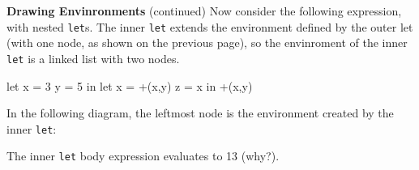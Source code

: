 \begin{minipage}[t]{\sw}
\slidenumber
\LARGE
{\bf Drawing Envinronments} (continued)\exx
Now consider the following expression,
with nested \verb'let's.
The inner \verb'let' extends the environment defined
by the outer let (with one node, as shown on the previous page),
so the envinroment of the inner \verb'let' is a linked
list with two nodes.
\Large
\begin{qv}
let
  x = 3
  y = 5
in
  let
    x = +(x,y) %
    z = x      %
  in
    +(x,y)
\end{qv}
\LARGE
In the following diagram,
the leftmost node is the environment created by the inner \verb'let':\\
\Large
\centerline{}
\LARGE
The inner \verb'let' body expression evaluates to 13 (why?).
\end{minipage}
